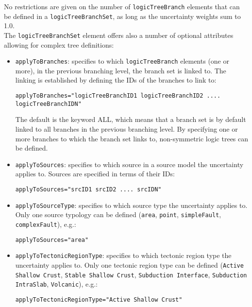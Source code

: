 No restrictions are given on the number of \Verb+logicTreeBranch+ elements that can be defined in a \Verb+logicTreeBranchSet+, as long as the uncertainty weights sum to 1.0.\\
The \Verb+logicTreeBranchSet+ element offers also a number of optional attributes allowing for complex tree definitions:
\begin{itemize}
\item \Verb+applyToBranches+: specifies to which \Verb+logicTreeBranch+ elements (one or more), in the previous branching level, the branch set is linked to. The linking is established by defining the IDs of the branches to link to:
\begin{Verbatim}[frame=single, commandchars=\\\{\}]
applyToBranches="logicTreeBranchID1 logicTreeBranchID2 .... logicTreeBranchIDN"
\end{Verbatim}
The default is the keyword ALL, which means that a branch set is by default linked to all branches in the previous branching level. By specifying one or more branches to which the branch set links to, non-symmetric logic trees can be defined.
\item \Verb+applyToSources+: specifies to which source in a source model the uncertainty applies to. Sources are specified in terms of their IDs:
\begin{Verbatim}[frame=single, commandchars=\\\{\}]
applyToSources="srcID1 srcID2 .... srcIDN"
\end{Verbatim}
\item \Verb+applyToSourceType+: specifies to which source type the uncertainty applies to.
Only one source typology can be defined (\Verb+area+, \Verb+point+, \Verb+simpleFault+, \Verb+complexFault+), e.g.:
\begin{Verbatim}[frame=single, commandchars=\\\{\}]
applyToSources="area"
\end{Verbatim}
\item \Verb+applyToTectonicRegionType+: specifies to which tectonic region type the uncertainty applies to. Only one tectonic region type can be defined (\Verb+Active Shallow Crust+, \Verb+Stable Shallow Crust+,  \Verb+Subduction Interface+, \Verb+Subduction IntraSlab+, \Verb+Volcanic+), e.g.:
\begin{Verbatim}[frame=single, commandchars=\\\{\}]
applyToTectonicRegionType="Active Shallow Crust"
\end{Verbatim}
\end{itemize}

